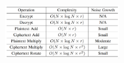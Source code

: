 \documentclass[10pt,handout]{beamer}
\begin{document}
\begin{frame}[noframenumbering]
\frametitle{}
\begin{figure}
    \includegraphics[width=0.45\textwidth]{complexity.png}
\end{figure}

\end{frame}

\begin{frame}[noframenumbering]
\frametitle{}

\end{frame}
\end{document}
